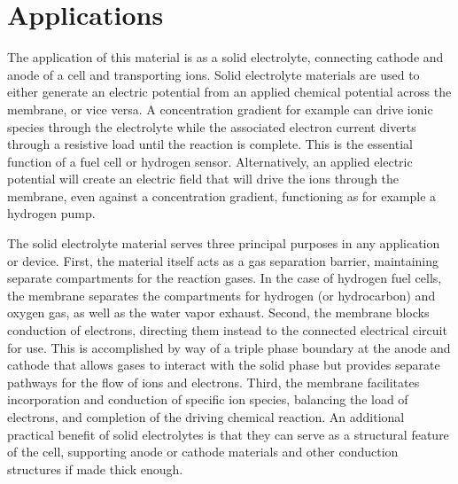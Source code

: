 \section{Applications}
The application of this material is as a solid electrolyte, connecting cathode and anode of a cell and transporting ions. Solid electrolyte materials are used to either generate an electric potential from an applied chemical potential across the membrane, or vice versa. A concentration gradient for example can drive ionic species through the electrolyte while the associated electron current diverts through a resistive load until the reaction is complete. This is the essential function of a fuel cell or hydrogen sensor. Alternatively, an applied electric potential will create an electric field that will drive the ions through the membrane, even against a concentration gradient, functioning as for example a hydrogen pump. 

The solid electrolyte material serves three principal purposes in any application or device. First, the material itself acts as a gas separation barrier, maintaining separate compartments for the reaction gases. In the case of hydrogen fuel cells, the membrane separates the compartments for hydrogen (or hydrocarbon) and oxygen gas, as well as the water vapor exhaust. Second, the membrane blocks conduction of electrons, directing them instead to the connected electrical circuit for use. This is accomplished by way of a triple phase boundary at the anode and cathode that allows gases to interact with the solid phase but provides separate pathways for the flow of ions and electrons. Third, the membrane facilitates incorporation and conduction of specific ion species, balancing the load of electrons, and completion of the driving chemical reaction. An additional practical benefit of solid electrolytes is that they can serve as a structural feature of the cell, supporting anode or cathode materials and other conduction structures if made thick enough.

